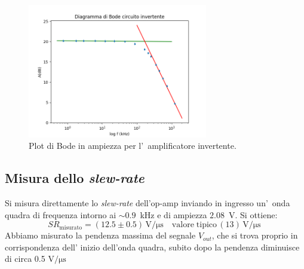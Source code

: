 \documentclass[10pt,a4paper]{article}
\begin{document}
\begin{table}[h]
\begin{center}
\begin{tabular}{|c|c|c|c|}
				\hline
			\end{tabular}
		\end{center}
	\end{table} 
	
	
	
	\begin{figure}[h]
		\begin{center}
			
			\includegraphics[width=0.7\textwidth]{bodeInvertente}
			\caption{\small Plot di Bode in ampiezza per l'~amplificatore invertente.}
			\label{fig:bodeinv}
		\end{center}
	\end{figure}
	\subsection{Misura dello \emph{slew-rate}}
	Si misura direttamente lo \emph{slew-rate} dell'op-amp inviando in ingresso un'~onda quadra 
	di frequenza intorno ai $\sim 0.9$~kHz e di ampiezza $2.08$~V. Si ottiene:
	\[
	SR_\mathrm{misurato} = (12.5 \pm 0.5 )\,\mathrm{V/\mu s} \quad \mathrm{valore \; tipico}\, (13 )\,\mathrm{V/\mu s}\
	\]
Abbiamo misurato la  pendenza massima del segnale $V_{out}$, che si trova proprio  in corrispondenza dell' inizio dell'onda quadra, subito dopo la pendenza diminuisce di circa 0.5 $ \mathrm{V/\mu s}$
\end{document}
